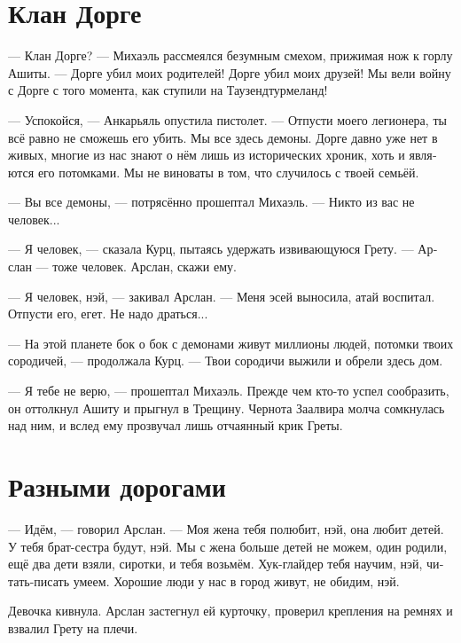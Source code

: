 \documentclass[a4paper,10pt,fleqn]{book}\usepackage{polyglossia}\setdefaultlanguage[babelshorthands=true]{russian}\setotherlanguage{english}\defaultfontfeatures{Ligatures=TeX,Mapping=tex-text}\usepackage{xcolor}\newcommand{\ml}[3]{#2}
\begin{document}
\section{Клан Дорге}

--- Клан Дорге? --- Михаэль рассмеялся безумным смехом, прижимая нож к горлу Ашиты.
--- Дорге убил моих родителей!
\ml{$0$}
{Дорге убил моих друзей!}
{Dourgue killed my friends!}
\ml{$0$}
{Мы вели войну с Дорге с того момента, как ступили на Таузендтурмеланд!}
{We were fighting Dourgue since we landed Tausendt\"{u}rmeland!''}

--- Успокойся, --- Анкарьяль опустила пистолет.
--- Отпусти моего легионера, ты всё равно не сможешь его убить.
Мы все здесь демоны.
Дорге давно уже нет в живых, многие из нас знают о нём лишь из исторических хроник, хоть и являются его потомками.
Мы не виноваты в том, что случилось с твоей семьёй.

--- Вы все демоны, --- потрясённо прошептал Михаэль.
--- Никто из вас не человек...

--- Я человек, --- сказала Курц, пытаясь удержать извивающуюся Грету.
--- Арслан --- тоже человек.
Арслан, скажи ему.

--- Я человек, нэй, --- закивал Арслан.
\ml{$0$}
{--- Меня эсей выносила, атай воспитал.}
{``\textit{\OE{}s\ae{}} carried me, \textit{at\ae{}} teached me.}
\ml{$0$}
{Отпусти его, егет.}
{Let him go, \textit{jeget}.}
Не надо драться...

--- На этой планете бок о бок с демонами живут миллионы людей, потомки твоих сородичей, --- продолжала Курц.
--- Твои сородичи выжили и обрели здесь дом.

--- Я тебе не верю, --- прошептал Михаэль.
Прежде чем кто-то успел сообразить, он оттолкнул Ашиту и прыгнул в Трещину.
Чернота Заалвира молча сомкнулась над ним, и вслед ему прозвучал лишь отчаянный крик Греты.

\section{Разными дорогами}

--- Идём, --- говорил Арслан.
--- Моя жена тебя полюбит, нэй, она любит детей.
У тебя брат-сестра будут, нэй.
Мы с жена больше детей не можем, один родили, ещё два дети взяли, сиротки, и тебя возьмём.
Хук-глайдер тебя научим, нэй, читать-писать умеем.
Хорошие люди у нас в город живут, не обидим, нэй.

Девочка кивнула.
Арслан застегнул ей курточку, проверил крепления на ремнях и взвалил Грету на плечи.
\end{document}
